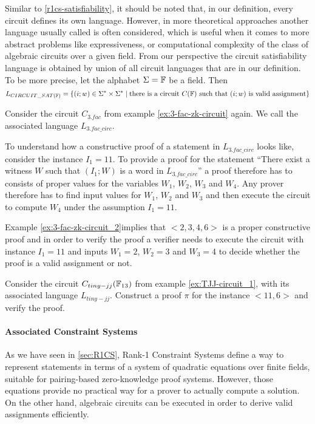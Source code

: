 \begin{remark} Similar to \ref{r1cs-satisfiability}, it should be noted that, in our definition, every circuit defines its own language. However, in more theoretical approaches another language usually called  is often considered, which is useful when it comes to more abstract problems like expressiveness, or computational complexity of the class of  algebraic circuits over a given field. From our perspective the circuit satisfiability language is obtained by union of all circuit languages that are in our definition. To be more precise, let the alphabet $\Sigma=\mathbb{F}$ be a field. Then 
$$
L_{CIRCUIT\_SAT(\mathbb{F})} = \{(i;w)\in \Sigma^*\times \Sigma^*\;|\; \text{there is a circuit } C(\mathbb{F}) \text{ such that } (i;w) \text{ is valid assignment}\}
$$
\end{remark}
\begin{example}[3-Factorization]Consider the circuit $C_{3.fac}$ from example \ref{ex:3-fac-zk-circuit} again. We call the associated language $L_{3.fac\_circ}$.

To understand how a constructive proof of a statement in $L_{3.fac\_circ}$ looks like, consider the instance $I_1= 11$. To provide a proof for the statement ``There exist a witness $W$ such that $(I_1;W)$ is a word in $L_{3.fac\_circ}$'' a proof therefore has to consists of proper values for the variables $W_1$, $W_2$, $W_3$ and $W_4$. Any prover therefore has to find input values for $W_1$, $W_2$ and $W_3$ and then execute the circuit to compute $W_4$ under the assumption $I_1=11$. 

Example \ref{ex:3-fac-zk-circuit_2}implies that $<2,3,4,6>$ is a proper constructive proof and in order to verify the proof a verifier needs to execute the circuit with instance $I_1=11$ and inputs $W_1=2$, $W_2=3$ and $W_3=4$ to decide whether the proof is a valid assignment or not. 
\end{example}
\begin{exercise}
Consider the circuit $C_{tiny-jj}(\mathbb{F}_{13})$ from example \ref{ex:TJJ-circuit_1}, with its associated language $L_{tiny-jj}$. Construct a proof $\pi$ for the instance $<11,6>$ and verify the proof.
\end{exercise}

\paragraph{Associated Constraint Systems}
\label{sec:circuits_associated_R1CS} As we have seen in \ref{sec:R1CS}, Rank-1 Constraint Systems define a way to represent statements in terms of a system of quadratic equations over finite fields, suitable for pairing-based zero-knowledge proof systems. However,  those equations provide no practical way for a prover to actually compute a solution. On the other hand, algebraic circuits can be executed in order to derive valid assignments efficiently. 

